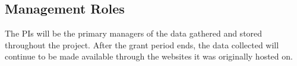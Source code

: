 \subsection*{Management Roles}
The PIs will be the primary managers of the data gathered and stored throughout the project.
After the grant period ends, the data collected will continue to be made available through the websites it was originally hosted on. 



